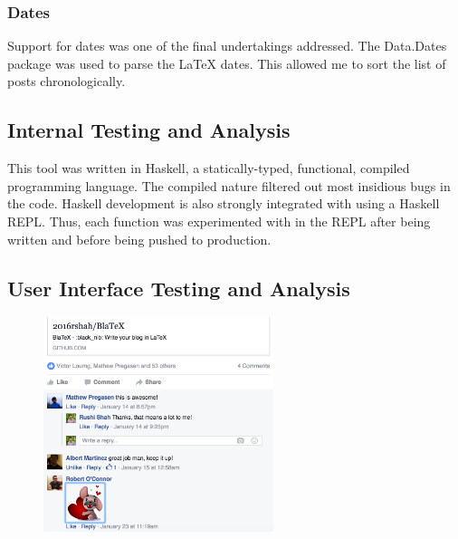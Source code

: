 \documentclass[doc,apacite,12pt]{apa6}
\begin{document}
  \subsubsection{Dates}

    Support for dates was one of the final undertakings addressed. The Data.Dates package was used to parse the LaTeX dates. This allowed me to sort the list of posts chronologically.  


\subsection{Internal Testing and Analysis}
  This tool was written in Haskell, a statically-typed, functional, compiled programming language. The compiled nature filtered out most insidious bugs in the code. Haskell development is also strongly integrated with using a Haskell REPL. Thus, each function was experimented with in the REPL after being written and before being pushed to production. 


\subsection{User Interface Testing and Analysis}

  \begin{figure}
      \includegraphics[width=0.6\textwidth]{facebook}
    \centering
  \end{figure}
\end{document}
